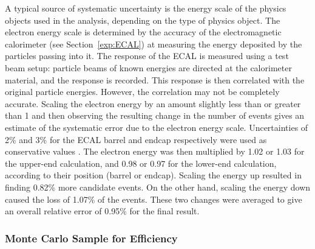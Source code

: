 A typical source of systematic uncertainty 
is the energy scale of the physics objects 
used in the analysis, 
depending on the type of physics object.  
The electron energy scale is determined 
by the accuracy of the electromagnetic 
calorimeter (see Section~\ref{exp:ECAL})
at measuring the energy 
deposited by the particles passing into it.  
The response of the ECAL is measured 
using a test beam setup: 
particle beams of known energies are 
directed at the calorimeter material, 
and the response is recorded.  
This response is then correlated with the 
original particle energies.  
However, the correlation may not be completely 
accurate.  
Scaling the electron energy by an amount 
slightly less than or greater than 1 
and then observing the resulting change 
in the number of \Zee events 
gives an estimate of the systematic error 
due to the electron energy scale.  
Uncertainties of 2\% and 3\% %
for the ECAL barrel and endcap respectively 
were used as conservative values \cite{CMS-PAS-EGM-10-003}.  
The electron energy was then multiplied 
by 1.02 or 1.03 for the upper-end calculation, 
and 0.98 or 0.97 for the lower-end calculation, 
according to their position (barrel or endcap).  
Scaling the energy up resulted in finding 
0.82\% more \Zee candidate events.  
On the other hand, scaling the energy down 
caused the loss of 1.07\% of the events.  
These two changes were averaged 
to give an overall relative error 
of 0.95\% for the final result.  

\subsubsection{Monte Carlo Sample for Efficiency}
\label{anMeth:SystsOtherMCEff}


